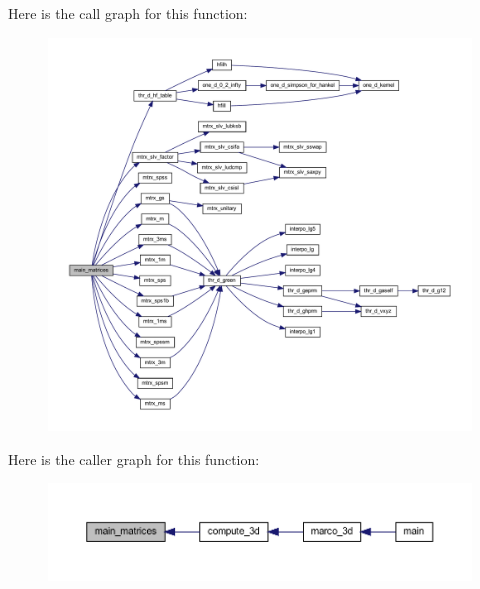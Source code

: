 Here is the call graph for this function\+:
\nopagebreak
\begin{figure}[H]
\begin{center}
\leavevmode
\includegraphics[width=350pt]{Marco_8f90_a399bcda7d08fa780bc7a58673659436b_cgraph}
\end{center}
\end{figure}
Here is the caller graph for this function\+:
\nopagebreak
\begin{figure}[H]
\begin{center}
\leavevmode
\includegraphics[width=350pt]{Marco_8f90_a399bcda7d08fa780bc7a58673659436b_icgraph}
\end{center}
\end{figure}
\mbox{\label{Marco_8f90_a81389ef2893dbfd5d6a4c769758b1336}} 
